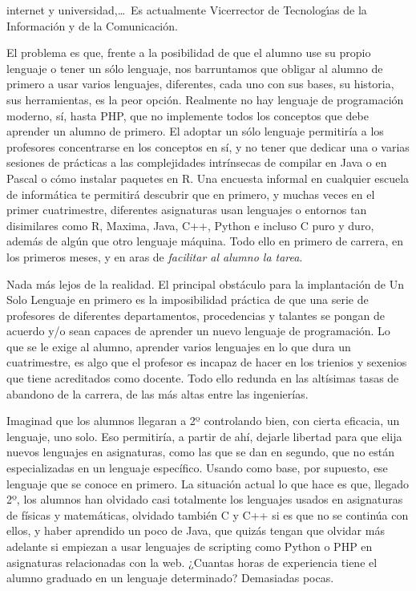 \documentclass[twoside,10pt]{article}
\begin{document}
\begin{multicols}{2}
{{\begin{window}
		internet y universidad,\ldots\ 
		Es actualmente Vicerrector de Tecnolog\'{\i}as de la Informaci\'{o}n y
de la Comunicaci\'{o}n.   
		\end{window}}}

El problema es que, frente a la posibilidad de que el alumno use su
propio lenguaje o tener un sólo lenguaje, nos barruntamos que obligar
al alumno de primero a usar varios lenguajes, diferentes, cada uno con
sus bases, su historia, sus herramientas, es la peor opción. Realmente
no hay lenguaje de programación moderno, sí, hasta PHP, que no
implemente todos los conceptos que debe aprender un alumno de
primero. El adoptar un sólo lenguaje permitiría a los profesores
concentrarse en los conceptos en sí, y no tener que dedicar una o
varias sesiones de prácticas a las complejidades intrínsecas de
compilar en Java o en Pascal o cómo instalar paquetes en R. Una
encuesta informal en cualquier escuela de informática te permitirá
descubrir que en primero, y muchas veces en el primer cuatrimestre,
diferentes asignaturas usan lenguajes o entornos tan disimilares como
R, Maxima, Java, C++, Python e incluso C puro y duro, además de algún
que otro lenguaje máquina. Todo ello en primero de carrera, en los
primeros meses, y en aras de {\em facilitar al alumno la tarea}. 

Nada más lejos de la realidad. El principal obstáculo para la
implantación de Un Solo Lenguaje en primero es la imposibilidad
práctica de que una serie de profesores de diferentes departamentos,
procedencias y talantes se pongan de acuerdo y/o sean capaces de
aprender un nuevo lenguaje de programación. Lo que se le exige al
alumno, aprender varios lenguajes en lo que dura un cuatrimestre, es
algo que el profesor es incapaz de hacer en los trienios y sexenios
que tiene acreditados como docente. Todo ello redunda en las altísimas
tasas de abandono de la carrera, de las más altas entre las
ingenierías. 

Imaginad que los alumnos llegaran a 2º controlando bien, con cierta
eficacia, un lenguaje, uno solo. Eso permitiría, a partir de ahí,
dejarle libertad para que elija nuevos lenguajes en asignaturas, como
las que se dan en segundo, que no están especializadas en un lenguaje
específico. Usando como base, por supuesto, ese lenguaje que se conoce
en primero. La situación actual lo que hace es que, llegado 2º, los
alumnos han olvidado casi totalmente los lenguajes usados en
asignaturas de físicas y matemáticas, olvidado también C y C++ si es
que no se continúa con ellos, y haber aprendido un poco de Java, que
quizás tengan que olvidar más adelante si empiezan a usar lenguajes de
scripting como Python o PHP en asignaturas relacionadas con la
web. ¿Cuantas horas de experiencia tiene el alumno graduado en un
lenguaje determinado? Demasiadas pocas.


\end{multicols}
\end{document}
